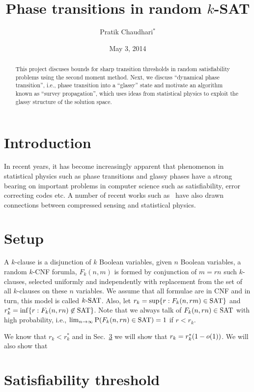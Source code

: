 \documentclass[letterpaper, 10pt, twocolumn, reqno]{amsart}
\title{Phase transitions in random $k$-SAT}
\author{Pratik Chaudhari$^*$}
\date{May 3, 2014}
\begin{document}
\begin{abstract}
This project discuses bounds for sharp transition thresholds in random satisfiability problems using the second moment method. Next, we discuss ``dynamical phase transition'', i.e., phase transition into a ``glassy'' state and motivate an algorithm known as ``survey propagation'', which uses ideas from statistical physics to exploit the glassy structure of the solution space.
\end{abstract}
\maketitle

\section{Introduction}
In recent years, it has become increasingly apparent that phenomenon in statistical physics such as phase transitions and glassy phases have a strong bearing on important problems in computer science such as satisfiability, error correcting codes etc. A number of recent works such as~\cite{krzakala2012statistical} have also drawn connections between compressed sensing and statistical physics.


\section{Setup}
\label{sec:setup}
A $k$-clause is a disjunction of $k$ Boolean variables, given $n$ Boolean
variables, a random $k$-CNF forumla, $F_k(n, m)$ is formed by conjunction of $m = rn$ such $k$-clauses, selected uniformly and independently with
replacement from the set of all $k$-clauses on these $n$ variables. We assume that all formulae are in CNF and in turn, this model is called $k\textrm{-SAT}$. Also,
let $r_k = \sup \{ r: F_k(n, rm) \in \textrm{SAT} \}$ and $r_k^* = \inf \{ r: F_k(n, rn) \not\in \textrm{SAT} \}$. Note that we always talk of $F_k(n,rn) \in \textrm{SAT}$ with high probability, i.e., $\lim_{n\to \infty} \textrm{P}(F_k(n,rn) \in \textrm{SAT}) = 1$ if $r < r_k$.

We know that $r_k < r_k^*$ and in Sec.~\ref{sec:sat_thresh}
 we will show that $r_k = r_k^*(1-o(1))$. We will also show that

\section{Satisfiability threshold}
\label{sec:sat_thresh}
\end{document}
